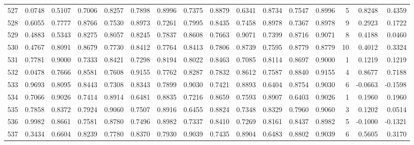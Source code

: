 \begin{tabular}{lrrrrrrrrrrrrrrr}
527 &      0.0748 &  0.5107 &  0.7006 &  0.8257 &  0.7898 &  0.8996 &  0.7375 &  0.8879 &  0.6341 &  0.8734 &   0.7547 &     0.8996 &      5 &                    0.8248 &                     0.4359 \\
528 &      0.6055 &  0.7777 &  0.8766 &  0.7530 &  0.8973 &  0.7261 &  0.7995 &  0.8435 &  0.7458 &  0.8978 &   0.7367 &     0.8978 &      9 &                    0.2923 &                     0.1722 \\
529 &      0.4883 &  0.5343 &  0.8275 &  0.8057 &  0.8245 &  0.7837 &  0.8608 &  0.7663 &  0.9071 &  0.7399 &   0.8716 &     0.9071 &      8 &                    0.4188 &                     0.0460 \\
530 &      0.4767 &  0.8091 &  0.8679 &  0.7730 &  0.8412 &  0.7764 &  0.8413 &  0.7806 &  0.8739 &  0.7595 &   0.8779 &     0.8779 &     10 &                    0.4012 &                     0.3324 \\
531 &      0.7781 &  0.9000 &  0.7333 &  0.8421 &  0.7298 &  0.8194 &  0.8022 &  0.8463 &  0.7085 &  0.8114 &   0.8697 &     0.9000 &      1 &                    0.1219 &                     0.1219 \\
532 &      0.0478 &  0.7666 &  0.8581 &  0.7608 &  0.9155 &  0.7762 &  0.8287 &  0.7832 &  0.8612 &  0.7587 &   0.8840 &     0.9155 &      4 &                    0.8677 &                     0.7188 \\
533 &      0.9693 &  0.8095 &  0.8443 &  0.7308 &  0.8343 &  0.7899 &  0.9030 &  0.7421 &  0.8893 &  0.6404 &   0.8754 &     0.9030 &      6 &                   -0.0663 &                    -0.1598 \\
534 &      0.7066 &  0.9026 &  0.7414 &  0.8914 &  0.6481 &  0.8835 &  0.7216 &  0.8659 &  0.7593 &  0.8907 &   0.6403 &     0.9026 &      1 &                    0.1960 &                     0.1960 \\
535 &      0.7858 &  0.8372 &  0.7924 &  0.9060 &  0.7507 &  0.8916 &  0.6455 &  0.8824 &  0.7348 &  0.8329 &   0.7960 &     0.9060 &      3 &                    0.1202 &                     0.0514 \\
536 &      0.9982 &  0.8661 &  0.7581 &  0.8780 &  0.7496 &  0.8982 &  0.7337 &  0.8410 &  0.7269 &  0.8161 &   0.8437 &     0.8982 &      5 &                   -0.1000 &                    -0.1321 \\
537 &      0.3434 &  0.6604 &  0.8239 &  0.7780 &  0.8370 &  0.7930 &  0.9039 &  0.7435 &  0.8904 &  0.6483 &   0.8802 &     0.9039 &      6 &                    0.5605 &                     0.3170 \\

\end{tabular}

